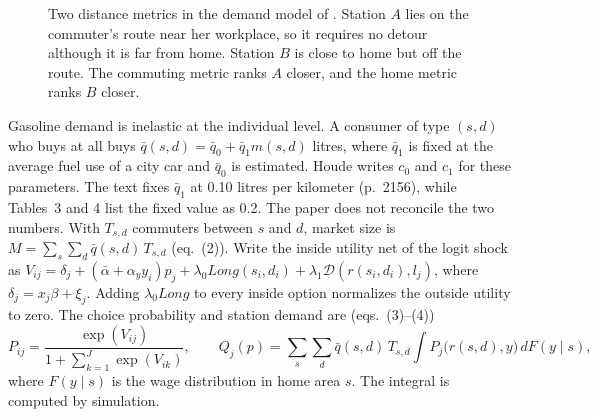 \begin{figure}[htbp]
\centering
{}
\caption{Two distance metrics in the demand model of \citet{Houde2012}. Station $A$ lies on the commuter's route
near her workplace, so it requires no detour although it is far from home. Station $B$ is close to home but off the
route. The commuting metric ranks $A$ closer, and the home metric ranks $B$ closer.}
\label{fig:11-detour}
\end{figure}

Gasoline demand is inelastic at the individual level. A consumer of type $(s,d)$ who buys at all buys
$\bar q(s,d) = \bar q_0 + \bar q_1 m(s,d)$ litres, where $\bar q_1$ is fixed at the average fuel use of a city car and
$\bar q_0$ is estimated. Houde writes $c_0$ and $c_1$ for these parameters. The text fixes $\bar q_1$ at 0.10 litres
per kilometer (p.~2156), while Tables~3 and 4 list the fixed value as 0.2. The paper does not reconcile the two
numbers. With $T_{s,d}$ commuters between $s$ and
$d$, market size is $M = \sum_s\sum_d \bar q(s,d)\,T_{s,d}$ (eq.~(2)). Write the inside utility net of the
logit shock as $V_{ij} = \delta_j + (\bar\alpha + \alpha_y y_i)p_j + \lambda_0\mathit{Long}(s_i,d_i) +
\lambda_1\mathcal{D}(r(s_i,d_i),l_j)$, where $\delta_j = x_j\beta + \xi_j$. Adding $\lambda_0\mathit{Long}$ to every
inside option normalizes the outside utility to zero. The choice probability and station demand are (eqs.~(3)--(4))
\begin{equation}\label{eq:11-houde-demand}
P_{ij} = \frac{\exp(V_{ij})}{1 + \sum_{k=1}^{J}\exp(V_{ik})},
\qquad
Q_j(p) = \sum_s\sum_d \bar q(s,d)\, T_{s,d}\int P_{j}\big(r(s,d), y\big)\, dF(y \mid s),
\end{equation}
where $F(y \mid s)$ is the wage distribution in home area $s$. The integral is computed by simulation.

